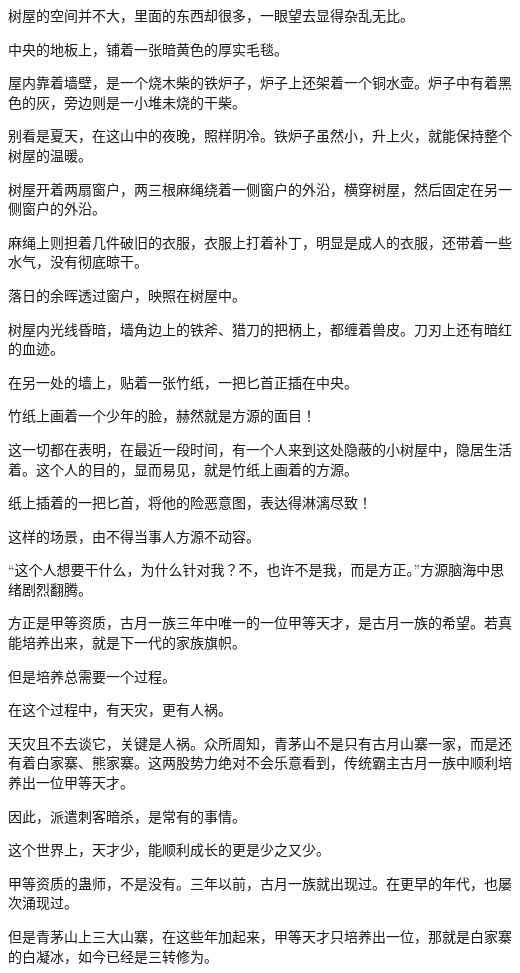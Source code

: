 
\begin{this_body}

树屋的空间并不大，里面的东西却很多，一眼望去显得杂乱无比。

中央的地板上，铺着一张暗黄色的厚实毛毯。

屋内靠着墙壁，是一个烧木柴的铁炉子，炉子上还架着一个铜水壶。炉子中有着黑色的灰，旁边则是一小堆未烧的干柴。

别看是夏天，在这山中的夜晚，照样阴冷。铁炉子虽然小，升上火，就能保持整个树屋的温暖。

树屋开着两扇窗户，两三根麻绳绕着一侧窗户的外沿，横穿树屋，然后固定在另一侧窗户的外沿。

麻绳上则担着几件破旧的衣服，衣服上打着补丁，明显是成人的衣服，还带着一些水气，没有彻底晾干。

落日的余晖透过窗户，映照在树屋中。

树屋内光线昏暗，墙角边上的铁斧、猎刀的把柄上，都缠着兽皮。刀刃上还有暗红的血迹。

在另一处的墙上，贴着一张竹纸，一把匕首正插在中央。

竹纸上画着一个少年的脸，赫然就是方源的面目！

这一切都在表明，在最近一段时间，有一个人来到这处隐蔽的小树屋中，隐居生活着。这个人的目的，显而易见，就是竹纸上画着的方源。

纸上插着的一把匕首，将他的险恶意图，表达得淋漓尽致！

这样的场景，由不得当事人方源不动容。

“这个人想要干什么，为什么针对我？不，也许不是我，而是方正。”方源脑海中思绪剧烈翻腾。

方正是甲等资质，古月一族三年中唯一的一位甲等天才，是古月一族的希望。若真能培养出来，就是下一代的家族旗帜。

但是培养总需要一个过程。

在这个过程中，有天灾，更有人祸。

天灾且不去谈它，关键是人祸。众所周知，青茅山不是只有古月山寨一家，而是还有着白家寨、熊家寨。这两股势力绝对不会乐意看到，传统霸主古月一族中顺利培养出一位甲等天才。

因此，派遣刺客暗杀，是常有的事情。

这个世界上，天才少，能顺利成长的更是少之又少。

甲等资质的蛊师，不是没有。三年以前，古月一族就出现过。在更早的年代，也屡次涌现过。

但是青茅山上三大山寨，在这些年加起来，甲等天才只培养出一位，那就是白家寨的白凝冰，如今已经是三转修为。


\end{this_body}
